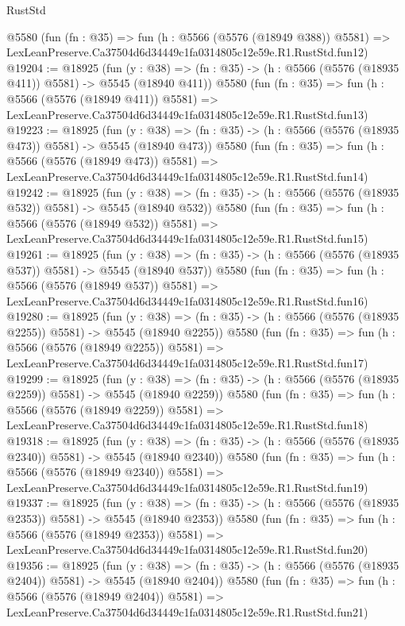 \begin{lexlean}{RustStd}
\begin{coremodule}
    @5580
    (fun (fn : @35) =>
    fun (h : @5566 (@5576 (@18949 @388)) @5581) =>
    LexLeanPreserve.Ca37504d6d34449c1fa0314805c12e59e.R1.RustStd.fun12)
@19204 := @18925
    (fun (y : @38) => (fn : @35) -> (h : @5566 (@5576 (@18935 @411)) @5581) -> @5545 (@18940 @411))
    @5580
    (fun (fn : @35) =>
    fun (h : @5566 (@5576 (@18949 @411)) @5581) =>
    LexLeanPreserve.Ca37504d6d34449c1fa0314805c12e59e.R1.RustStd.fun13)
@19223 := @18925
    (fun (y : @38) => (fn : @35) -> (h : @5566 (@5576 (@18935 @473)) @5581) -> @5545 (@18940 @473))
    @5580
    (fun (fn : @35) =>
    fun (h : @5566 (@5576 (@18949 @473)) @5581) =>
    LexLeanPreserve.Ca37504d6d34449c1fa0314805c12e59e.R1.RustStd.fun14)
@19242 := @18925
    (fun (y : @38) => (fn : @35) -> (h : @5566 (@5576 (@18935 @532)) @5581) -> @5545 (@18940 @532))
    @5580
    (fun (fn : @35) =>
    fun (h : @5566 (@5576 (@18949 @532)) @5581) =>
    LexLeanPreserve.Ca37504d6d34449c1fa0314805c12e59e.R1.RustStd.fun15)
@19261 := @18925
    (fun (y : @38) => (fn : @35) -> (h : @5566 (@5576 (@18935 @537)) @5581) -> @5545 (@18940 @537))
    @5580
    (fun (fn : @35) =>
    fun (h : @5566 (@5576 (@18949 @537)) @5581) =>
    LexLeanPreserve.Ca37504d6d34449c1fa0314805c12e59e.R1.RustStd.fun16)
@19280 := @18925
    (fun (y : @38) =>
    (fn : @35) -> (h : @5566 (@5576 (@18935 @2255)) @5581) -> @5545 (@18940 @2255))
    @5580
    (fun (fn : @35) =>
    fun (h : @5566 (@5576 (@18949 @2255)) @5581) =>
    LexLeanPreserve.Ca37504d6d34449c1fa0314805c12e59e.R1.RustStd.fun17)
@19299 := @18925
    (fun (y : @38) =>
    (fn : @35) -> (h : @5566 (@5576 (@18935 @2259)) @5581) -> @5545 (@18940 @2259))
    @5580
    (fun (fn : @35) =>
    fun (h : @5566 (@5576 (@18949 @2259)) @5581) =>
    LexLeanPreserve.Ca37504d6d34449c1fa0314805c12e59e.R1.RustStd.fun18)
@19318 := @18925
    (fun (y : @38) =>
    (fn : @35) -> (h : @5566 (@5576 (@18935 @2340)) @5581) -> @5545 (@18940 @2340))
    @5580
    (fun (fn : @35) =>
    fun (h : @5566 (@5576 (@18949 @2340)) @5581) =>
    LexLeanPreserve.Ca37504d6d34449c1fa0314805c12e59e.R1.RustStd.fun19)
@19337 := @18925
    (fun (y : @38) =>
    (fn : @35) -> (h : @5566 (@5576 (@18935 @2353)) @5581) -> @5545 (@18940 @2353))
    @5580
    (fun (fn : @35) =>
    fun (h : @5566 (@5576 (@18949 @2353)) @5581) =>
    LexLeanPreserve.Ca37504d6d34449c1fa0314805c12e59e.R1.RustStd.fun20)
@19356 := @18925
    (fun (y : @38) =>
    (fn : @35) -> (h : @5566 (@5576 (@18935 @2404)) @5581) -> @5545 (@18940 @2404))
    @5580
    (fun (fn : @35) =>
    fun (h : @5566 (@5576 (@18949 @2404)) @5581) =>
    LexLeanPreserve.Ca37504d6d34449c1fa0314805c12e59e.R1.RustStd.fun21)

\end{coremodule}
\end{lexlean}
